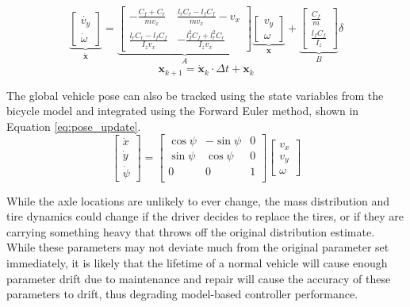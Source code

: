 \begin{equation}
\label{eq:vbm}
\underbrace{
\begin{bmatrix} \dot{v_y} \\ \dot{\omega} \end{bmatrix}
}_\mathbf{\dot{x}} =
\underbrace{
\left[ \begin{smallmatrix}
-\frac{C_f + C_r}{m v_x} & \frac{l_r C_r - l_f C_f}{m v_x} - v_x \\
\frac{l_r C_r - l_f C_f}{I_z v_x} & -\frac{l_f^2 C_f + l_r^2 C_r}{I_z v_x}
\end{smallmatrix} \right]}_A
\underbrace{
\begin{bmatrix} v_y \\ \omega \end{bmatrix}}_\mathbf{x} +
\underbrace{
\begin{bmatrix} \frac{C_f}{m} \\ \frac{l_f C_f}{I_z} \end{bmatrix}
}_B
\delta
\end{equation}
\begin{equation}
\label{eq:forward_euler}
\mathbf{x}_{k+1} = \mathbf{\dot{x}}_k \cdot \Delta t + \mathbf{x}_k
\end{equation}

The global vehicle pose can also be tracked using the state variables from the bicycle model and integrated using the Forward Euler method, shown in Equation \ref{eq:pose_update}.
\begin{equation}
\label{eq:pose_update}
\begin{bmatrix} 
\dot{x} \\ \dot{y} \\ \dot{\psi}
\end{bmatrix} = 
\begin{bmatrix} 
\cos\psi & -\sin\psi & 0\\ 
\sin\psi & \cos\psi & 0\\
0 & 0 & 1\\
\end{bmatrix}
\begin{bmatrix} 
v_x \\ v_y \\ \omega
\end{bmatrix}
\end{equation}

While the axle locations are unlikely to ever change, the mass distribution and tire dynamics could change if the driver decides to replace the tires, or if they are carrying something heavy that throws off the original distribution estimate. While these parameters may not deviate much from the original parameter set immediately, it is likely that the lifetime of a normal vehicle will cause enough parameter drift due to maintenance and repair will cause the accuracy of these parameters to drift, thus degrading model-based controller performance.

